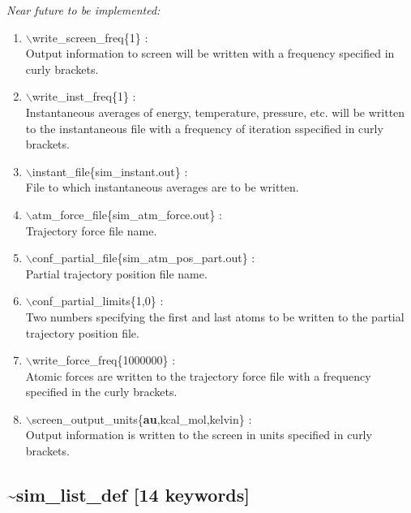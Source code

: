 \documentclass[12pt,titlepage]{article}
\begin{document}
{\it 
Near future to be implemented:
 \vspace{0.15in} 
 \begin{enumerate}
 \item   $\backslash$write\_screen\_freq\{1\} : \\
   Output information to screen will be written with a frequency specified
   in curly brackets.
 \item   $\backslash$write\_inst\_freq\{1\} : \\
     Instantaneous averages of energy, temperature, pressure, etc. will be 
     written to the instantaneous file with a frequency of iteration sspecified in curly 
     brackets.
 \item   $\backslash$instant\_file\{sim\_instant.out\} : \\
     File to which instantaneous averages are to be written.
    
 \item   $\backslash$atm\_force\_file\{sim\_atm\_force.out\} : \\
     Trajectory force file name.

 \item   $\backslash$conf\_partial\_file\{sim\_atm\_pos\_part.out\} : \\
     Partial trajectory position file name.

 \item   $\backslash$conf\_partial\_limits\{1,0\} : \\
   Two numbers specifying the first and last atoms to be written to
   the partial trajectory position file.

 \item   $\backslash$write\_force\_freq\{1000000\} : \\
   Atomic forces are written to the trajectory force file with a
   frequency specified in the curly brackets.

 \item   $\backslash$screen\_output\_units\{{\bf au},kcal\_mol,kelvin\} : \\
   Output information is written to the screen in units specified 
   in curly brackets.

   
\end{enumerate}
}


\newpage
\subsection*{\bf \~{}sim\_list\_def [14 keywords]}
\end{document}
